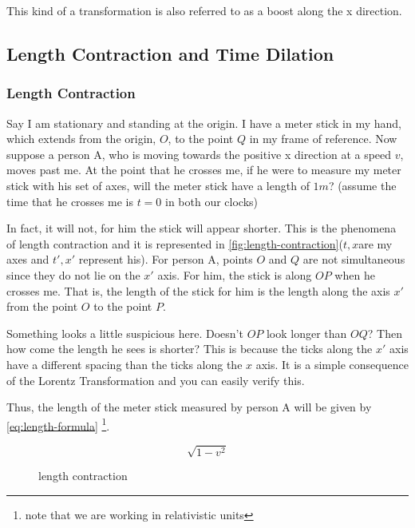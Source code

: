 \documentclass[12pt]{article}
\numberwithin{equation}{section}
\theoremstyle{plain}
\theoremstyle{definition}
\begin{document}
This kind of a transformation is also referred to as a boost along the x direction.

\subsection{Length Contraction and Time Dilation}

\subsubsection*{Length Contraction}
\hspace{\fill}
Say I am stationary and standing at the origin. I have a meter stick in my hand, which extends from the origin, $O$, to the point $Q$ in my frame of reference. Now suppose a person A, who is moving towards the positive x direction at a speed $v$, moves past me. At the point that he crosses me, if he were to measure my meter stick with his set of axes, will the meter stick have a length of $1m$? (assume the time that he crosses me is $t=0$ in both our clocks)

In fact, it will not, for him the stick will appear shorter. This is the phenomena of length contraction and it is represented in \autoref{fig:length-contraction}($t,x$are my axes and $t',x'$ represent his). For person A, points $O$ and $Q$ are not simultaneous since they do not lie on the $x'$ axis. For him, the stick is along $OP$ when he crosses me. That is, the length of the stick for him is the length along the axis $x'$ from the point $O$ to the point $P$. 

Something looks a little suspicious here. Doesn't $OP$ look longer than $OQ$? Then how come the length he sees is shorter? This is because the ticks along the $x'$ axis have a different spacing than the ticks along the $x$ axis. It is a simple consequence of the Lorentz Transformation and you can easily verify this. 

Thus, the length of the meter stick measured by person A will be given by \autoref{eq:length-formula} \footnote{note that we are working in relativistic units}.

\begin{equation}
    \sqrt{1-v^2}
    \label{eq:length-formula}
\end{equation}


\hspace{\fill}
\begin{figure}
    \centering
    \caption{length contraction}
    \label{fig:length-contraction}
\end{figure}
\end{document}
